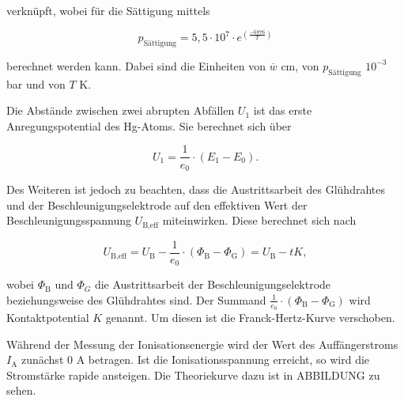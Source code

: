verknüpft, wobei für die Sättigung mittels

\begin{equation}
    \label{eqn:saettigung}
    p_\text{Sättigung} = 5,5 \cdot 10^7 \cdot e^(\frac{-6876}{T})
\end{equation}

berechnet werden kann. Dabei sind die Einheiten von $\overline{w}$ cm, von $p_\text{Sättigung}$ $10^{-3}$ bar und von $T$ K.


Die Abstände zwischen zwei abrupten Abfällen $U_1$ ist das erste Anregungspotential des Hg-Atoms. Sie berechnet sich über

\begin{equation}
    \label{eqn:anregungspotential}
    U_1 = \frac{1}{e_0} \cdot (E_1 - E_0).
\end{equation}

Des Weiteren ist jedoch zu beachten, dass die Austrittsarbeit des Glühdrahtes und der Beschleunigungselektrode auf den effektiven Wert der Beschleunigungsspannung $U_\text{B,eff}$ miteinwirken.
Diese berechnet sich nach

\begin{equation}
    \label{eqn:accl-eff}
    U_\text{B,eff} = U_\text{B} - \frac{1}{e_0} \cdot (\Phi_\text{B} - \Phi_\text{G}) = U_\text{B} -t K,
\end{equation}

wobei $\Phi_\text{B}$ und $\Phi_G$ die Austrittsarbeit der Beschleunigungselektrode beziehungsweise des Glühdrahtes sind.
Der Summand $\frac{1}{e_0} \cdot (\Phi_\text{B} - \Phi_\text{G})$ wird Kontaktpotential $K$ genannt. Um diesen ist die Franck-Hertz-Kurve verschoben.


Während der Messung der Ionisationsenergie wird der Wert des Auffängerstroms $I_\text{A}$ zunächst 0 A betragen.
Ist die Ionisationsspannung erreicht, so wird die Stromstärke rapide ansteigen. Die Theoriekurve dazu ist in ABBILDUNG zu sehen.

